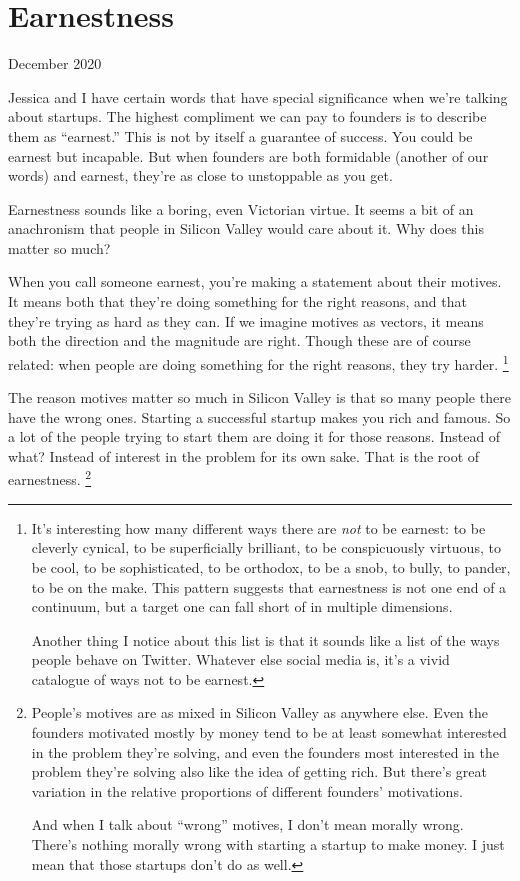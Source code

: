 \documentclass[12pt]{book}
\begin{document}
\chapter{Earnestness}

December 2020

Jessica and I have certain words that have special significance when
we're talking about startups. The highest compliment we can pay to
founders is to describe them as ``earnest.'' This is not by itself a
guarantee of success. You could be earnest but incapable. But when
founders are both formidable (another of our words) and earnest, they're
as close to unstoppable as you get.

Earnestness sounds like a boring, even Victorian virtue. It seems a bit
of an anachronism that people in Silicon Valley would care about it. Why
does this matter so much?

When you call someone earnest, you're making a statement about their
motives. It means both that they're doing something for the right
reasons, and that they're trying as hard as they can. If we imagine
motives as vectors, it means both the direction and the magnitude are
right. Though these are of course related: when people are doing
something for the right reasons, they try harder.
\footnote{It's interesting how many different ways there are \emph{not} to
be earnest: to be cleverly cynical, to be superficially brilliant, to be
conspicuously virtuous, to be cool, to be sophisticated, to be orthodox,
to be a snob, to bully, to pander, to be on the make. This pattern
suggests that earnestness is not one end of a continuum, but a target
one can fall short of in multiple dimensions.

Another thing I notice about this list is that it sounds like a list of
the ways people behave on Twitter. Whatever else social media is, it's a
vivid catalogue of ways not to be earnest.}

The reason motives matter so much in Silicon Valley is that so many
people there have the wrong ones. Starting a successful startup makes
you rich and famous. So a lot of the people trying to start them are
doing it for those reasons. Instead of what? Instead of interest in the
problem for its own sake. That is the root of earnestness.
\footnote{People's motives are as mixed in Silicon Valley as anywhere
else. Even the founders motivated mostly by money tend to be at least
somewhat interested in the problem they're solving, and even the
founders most interested in the problem they're solving also like the
idea of getting rich. But there's great variation in the relative
proportions of different founders' motivations.

And when I talk about ``wrong'' motives, I don't mean morally wrong.
There's nothing morally wrong with starting a startup to make money. I
just mean that those startups don't do as well.}
\end{document}
